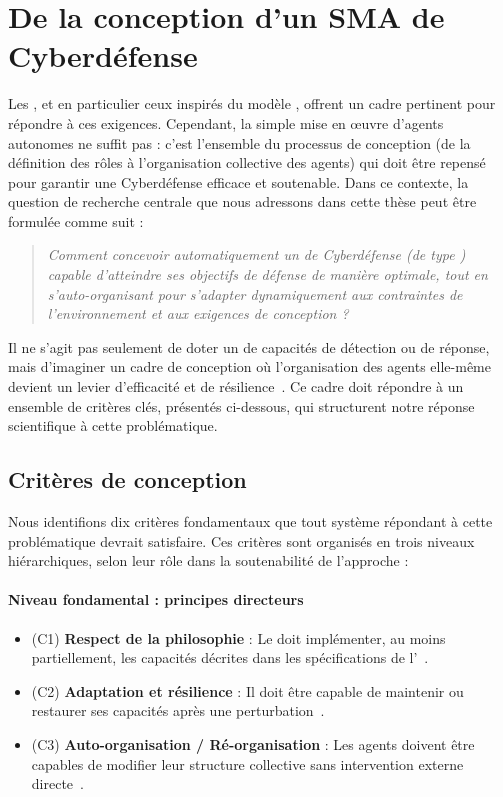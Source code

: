 \section{De la conception d'un SMA de Cyberdéfense}\label{sec:problematique-sma}

Les , et en particulier ceux inspirés du modèle , offrent un cadre pertinent pour répondre à ces exigences. Cependant, la simple mise en œuvre d'agents autonomes ne suffit pas : c'est l'ensemble du processus de conception (de la définition des rôles à l'organisation collective des agents) qui doit être repensé pour garantir une Cyberdéfense efficace et soutenable.
Dans ce contexte, la question de recherche centrale que nous adressons dans cette thèse peut être formulée comme suit :

\begin{quote}
    \emph{Comment concevoir automatiquement un  de Cyberdéfense (de type ) capable d'atteindre ses objectifs de défense de manière optimale, tout en s'auto-organisant pour s'adapter dynamiquement aux contraintes de l'environnement et aux exigences de conception ?}
\end{quote}

Il ne s'agit pas seulement de doter un  de capacités de détection ou de réponse, mais d'imaginer un cadre de conception où l'organisation des agents elle-même devient un levier d'efficacité et de résilience~\cite{Picard2006, DiMarzoSerugendo2006}. Ce cadre doit répondre à un ensemble de critères clés, présentés ci-dessous, qui structurent notre réponse scientifique à cette problématique.

\subsection*{Critères de conception}

Nous identifions dix critères fondamentaux que tout système répondant à cette problématique devrait satisfaire. Ces critères sont organisés en trois niveaux hiérarchiques, selon leur rôle dans la soutenabilité de l'approche :

\paragraph{Niveau fondamental : principes directeurs}
\begin{itemize}
    \item (C1) \textbf{Respect de la philosophie } : Le  doit implémenter, au moins partiellement, les capacités décrites dans les spécifications de l'~\cite{Kott2023}.
    \item (C2) \textbf{Adaptation et résilience} : Il doit être capable de maintenir ou restaurer ses capacités après une perturbation~\cite{Bodeau2011}.
    \item (C3) \textbf{Auto-organisation / Ré-organisation} : Les agents doivent être capables de modifier leur structure collective sans intervention externe directe~\cite{DiMarzoSerugendo2006}.
\end{itemize}

